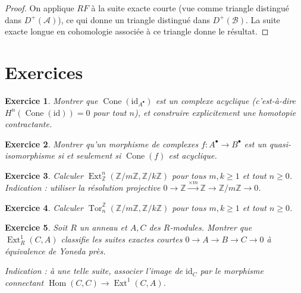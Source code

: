 \documentclass[a4paper,12pt]{book}
\DeclareMathOperator{\Hom}{Hom}
\newcommand{\id}{\mathrm{id}}
\newcommand{\Z}{\mathbb{Z}}
\newtheorem{exercice}{Exercice}[chapter]
\begin{document}
\begin{proof}
On applique $RF$ à la suite exacte courte (vue comme triangle distingué
dans $D^+(\mathcal{A})$), ce qui donne un triangle distingué dans
$D^+(\mathcal{B})$. La suite exacte longue en cohomologie associée
à ce triangle donne le résultat.
\end{proof}


\section{Exercices}\label{sec:exos-derived}

\begin{exercice}\label{exo:cone-id-acyclic}
Montrer que $\operatorname{Cone}(\id_{A^\bullet})$ est un complexe acyclique
(c'est-à-dire $H^n(\operatorname{Cone}(\id)) = 0$ pour tout $n$),
et construire explicitement une homotopie contractante.
\end{exercice}

\begin{exercice}\label{exo:quasi-iso-cone}
Montrer qu'un morphisme de complexes $f \colon A^\bullet \to B^\bullet$
est un quasi-isomorphisme si et seulement si
$\operatorname{Cone}(f)$ est acyclique.
\end{exercice}

\begin{exercice}\label{exo:ext-cyclic}
Calculer $\operatorname{Ext}_\Z^n(\Z/m\Z, \Z/k\Z)$ pour tous $m, k \geq 1$
et tout $n \geq 0$.
\textit{Indication : utiliser la résolution projective
$0 \to \Z \xrightarrow{\times m} \Z \to \Z/m\Z \to 0$.}
\end{exercice}

\begin{exercice}\label{exo:tor-cyclic}
Calculer $\operatorname{Tor}_n^\Z(\Z/m\Z, \Z/k\Z)$ pour tous $m, k \geq 1$
et tout $n \geq 0$.
\end{exercice}

\begin{exercice}\label{exo:ext-ses-interpretation}
Soit $R$ un anneau et $A, C$ des $R$-modules. Montrer que
$\operatorname{Ext}_R^1(C, A)$ classifie les suites exactes courtes
$0 \to A \to B \to C \to 0$ à équivalence de Yoneda près.

\textit{Indication : à une telle suite, associer l'image de $\id_C$ par
le morphisme connectant $\Hom(C, C) \to \operatorname{Ext}^1(C, A)$.}
\end{exercice}
\end{document}
